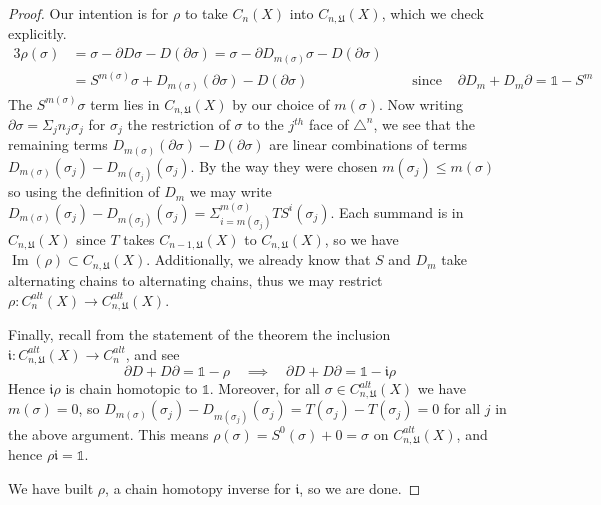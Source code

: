 \documentclass[11pt,a4paper,twoside]{article}
\theoremstyle{plain}
\theoremstyle{definition}
\theoremstyle{definition}
\theoremstyle{definition}
\theoremstyle{definition}
\theoremstyle{definition}
\DeclareMathOperator{\Ima}{Im}
\begin{document}
\begin{proof}
Our intention is for $\rho$ to take $C_n(X)$ into $C_{n,\mathfrak{U}}(X)$, which we check explicitly.
\begin{alignat*}{3}
 \rho(\sigma)&=\sigma-\partial D\sigma-D(\partial\sigma)=\sigma-\partial D_{m(\sigma)}\sigma-D(\partial\sigma)\\
&=S^{m(\sigma)}\sigma+D_{m(\sigma)}(\partial\sigma)-D(\partial\sigma)  & \quad \text{ since } & \partial D_m+D_m\partial=\mathbb{1}-S^m
\end{alignat*}
The $S^{m(\sigma)}\sigma$ term lies in $C_{n,\mathfrak{U}}(X)$ by our choice of $m(\sigma)$. Now writing $\partial\sigma=\Sigma_jn_j\sigma_j$ for $\sigma_j$ the restriction of $\sigma$ to the $j^{th}$ face of $\triangle^n$, we see that the remaining terms $D_{m(\sigma)}(\partial\sigma)-D(\partial\sigma)$ are linear combinations of terms $D_{m(\sigma)}(\sigma_j)-D_{m(\sigma_j)}(\sigma_j)$. By the way they were chosen $m(\sigma_j)\leq m(\sigma)$ so using the definition of $D_m$ we may write $D_{m(\sigma)}(\sigma_j)-D_{m(\sigma_j)}(\sigma_j)=\Sigma_{i=m(\sigma_j)}^{m(\sigma)}TS^i(\sigma_j)$. Each summand is in $C_{n,\mathfrak{U}}(X)$ since $T$ takes $C_{n\!-\!1,\mathfrak{U}}(X)$ to $C_{n,\mathfrak{U}}(X)$, so we have $\Ima(\rho)\subset C_{n,\mathfrak{U}}(X)$. Additionally, we already know that $S$ and $D_m$ take alternating chains to alternating chains, thus we may restrict  $\rho\!:\!C_{n}^{alt}(X)\!\longrightarrow\!C_{n,\mathfrak{U}}^{alt}(X)$.

Finally, recall from the statement of the theorem the inclusion $\mathfrak{i}\!:\!C_{n,\mathfrak{U}}^{alt}(X)\!\longrightarrow\!C_n^{alt}$, and see
$$\partial D+D\partial=\mathbb{1}-\rho\quad\implies\quad\partial D+D\partial=\mathbb{1}-\mathfrak{i}\rho$$
Hence $\mathfrak{i}\rho$ is chain homotopic to $\mathbb{1}$. Moreover, for all $\sigma\in C_{n,\mathfrak{U}}^{alt}(X)$ we have $m(\sigma)=0$, so $D_{m(\sigma)}(\sigma_j)-D_{m(\sigma_j)}(\sigma_j)=T(\sigma_j)-T(\sigma_j)=0$ for all $j$ in the above argument. This means $\rho(\sigma)=S^0(\sigma)+0=\sigma$ on $C_{n,\mathfrak{U}}^{alt}(X)$, and hence $\rho\mathfrak{i}=\mathbb{1}$.

We have built $\rho$, a chain homotopy inverse for $\mathfrak{i}$, so we are done.
\end{proof}
\end{document}
